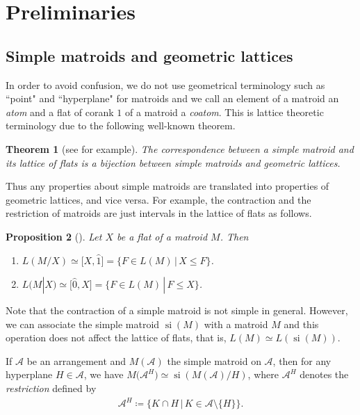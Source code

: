 \documentclass[pdftex]{sigma}
\numberwithin{equation}{section}
\newtheorem{Theorem}{Theorem}[section]
\newtheorem{Proposition}[Theorem]{Proposition}
 { \theoremstyle{definition}
\newtheorem{Definition}[Theorem]{Definition}
\newtheorem{Example}[Theorem]{Example}
\newtheorem{Remark}[Theorem]{Remark}
\newtheorem{Question}[Theorem]{Question} }
\DeclareMathOperator{\si}{si}
\begin{document}
\section{Preliminaries}\label{sec: preliminaries}

\subsection{Simple matroids and geometric lattices}

In order to avoid confusion, we do not use geometrical terminology such as ``point" and ``hyperplane" for matroids and we call an element of a matroid an \textit{atom} and a flat of corank $ 1 $ of a matroid a \textit{coatom}.
This is lattice theoretic terminology due to the following well-known theorem.

\begin{Theorem}[see {\cite[p.~54, Theorem 2]{welsh2010matroid}} for example]\label{simple matroid geometric lattice correspondence}
The correspondence between a simple matroid and its lattice of flats is a bijection between simple matroids and geometric lattices.
\end{Theorem}

Thus any properties about simple matroids are translated into properties of geometric lattices, and vice versa.
For example, the contraction and the restriction of matroids are just intervals in the lattice of flats as follows.

\begin{Proposition}[{\cite[Proposition 3.3.8]{oxley2011matroid}}]\label{Oxley interval}
Let $ X $ be a flat of a matroid $ M $. Then
\begin{enumerate}[$(1)$]\itemsep=0pt
\item\label{Oxley interval 1} $ L(M/X) \simeq \big[X, \hat{1}\big] = \{ F \in L(M) \,|\, X \leq F \} $.
\item\label{Oxley interval 2} $ L(M|X) \simeq \big[\hat{0}, X\big] = \{ F \in L(M) \,|\, F \leq X \} $.
\end{enumerate}
\end{Proposition}

Note that the contraction of a simple matroid is not simple in general.
However, we can associate the simple matroid $ \si(M) $ with a matroid $ M $ and this operation does not affect the lattice of flats, that is, $ L(M) \simeq L(\si(M)) $.

If $ \mathcal{A} $ be an arrangement and $ M(\mathcal{A}) $ the simple matroid on $ \mathcal{A} $, then for any hyperplane $ H \in \mathcal{A} $, we have $ M\big(\mathcal{A}^{H}\big) \simeq \si(M(\mathcal{A})/H) $, where $ \mathcal{A}^{H} $ denotes the \textit{restriction} defined by
\begin{gather*}
\mathcal{A}^{H} \coloneqq \{ K \cap H \,|\, K \in \mathcal{A}\setminus\{H\}\}.
\end{gather*}
\end{document}
